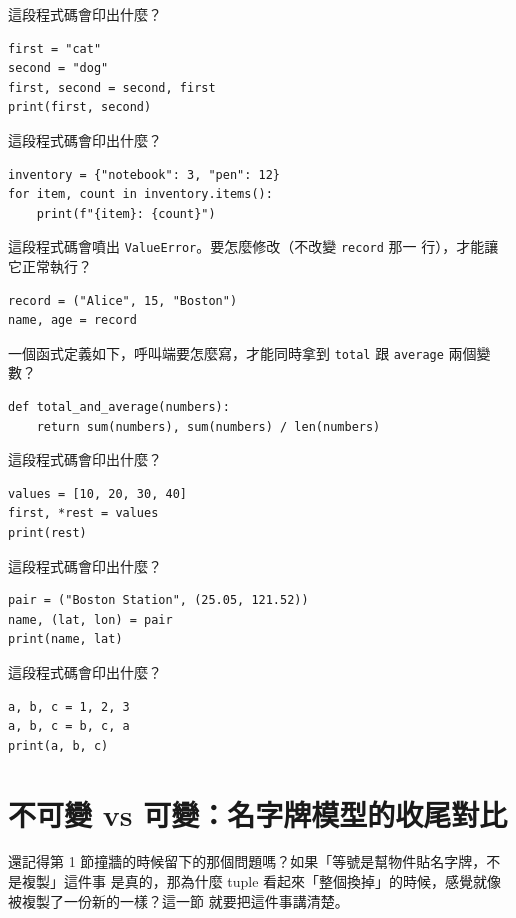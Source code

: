 \begin{drills}[label=drills:tuple-unpacking]
\item 這段程式碼會印出什麼？
\begin{verbatim}
first = "cat"
second = "dog"
first, second = second, first
print(first, second)
\end{verbatim}
\item 這段程式碼會印出什麼？
\begin{verbatim}
inventory = {"notebook": 3, "pen": 12}
for item, count in inventory.items():
    print(f"{item}: {count}")
\end{verbatim}
\item 這段程式碼會噴出 \texttt{ValueError}。要怎麼修改（不改變 \texttt{record} 那一
行），才能讓它正常執行？
\begin{verbatim}
record = ("Alice", 15, "Boston")
name, age = record
\end{verbatim}
\item 一個函式定義如下，呼叫端要怎麼寫，才能同時拿到 \texttt{total} 跟
\texttt{average} 兩個變數？
\begin{verbatim}
def total_and_average(numbers):
    return sum(numbers), sum(numbers) / len(numbers)
\end{verbatim}
\item 這段程式碼會印出什麼？
\begin{verbatim}
values = [10, 20, 30, 40]
first, *rest = values
print(rest)
\end{verbatim}
\item 這段程式碼會印出什麼？
\begin{verbatim}
pair = ("Boston Station", (25.05, 121.52))
name, (lat, lon) = pair
print(name, lat)
\end{verbatim}
\item 這段程式碼會印出什麼？
\begin{verbatim}
a, b, c = 1, 2, 3
a, b, c = b, c, a
print(a, b, c)
\end{verbatim}
\end{drills}

\section{不可變 vs 可變：名字牌模型的收尾對比}
\label{sec:tuple-vs-list}

還記得第 1 節撞牆的時候留下的那個問題嗎？如果「等號是幫物件貼名字牌，不是複製」這件事
是真的，那為什麼 tuple 看起來「整個換掉」的時候，感覺就像被複製了一份新的一樣？這一節
就要把這件事講清楚。

